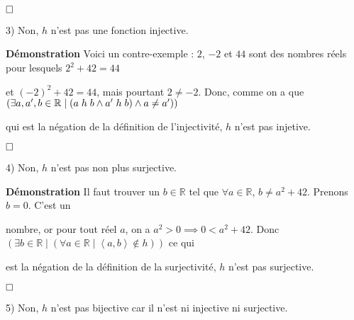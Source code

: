 \documentclass{article}
\newcommand{\tuple}[1]{\ensuremath{\left\langle #1 \right\rangle}}
\begin{document}
$\hfill \square$

3) Non, $h$ n'est pas une fonction injective.

\textbf{Démonstration} Voici un contre-exemple : $2$, $-2$ et $44$ sont des nombres réels pour lesquels $2^2 + 42 = 44$ 

et $(-2)^2 + 42 = 44$, mais pourtant $2 \neq -2$. Donc, comme on a que $ ( \exists a, a^{\prime}, b \in \mathbb{R} \mid ( a \hspace{.1cm} h \hspace{.1cm} b \land a^{\prime} \hspace{.1cm} h \hspace{.1cm} b) \land a \neq a^{\prime} )) $ 

qui est la négation de la définition de l'injectivité, $h$ n'est pas injetive.

$\hfill \square$

4) Non, $h$ n'est pas non plus surjective.

\textbf{Démonstration} Il faut trouver un $b \in \mathbb{R}$ tel que $\forall a \in \mathbb{R}$, $b \neq a^2 + 42$. Prenons $b=0$. C'est un 

nombre, or pour tout réel $a$, on a $a^2 > 0 \implies 0 < a^2 + 42$. Donc $( \exists b \in \mathbb{R} \mid ( \forall a \in \mathbb{R} \mid \tuple{a,b} \notin h ))$ ce qui 

est la négation de la définition de la surjectivité, $h$ n'est pas surjective.

$\hfill \square$

5) Non, $h$ n'est pas bijective car il n'est ni injective ni surjective.

\vspace{0.5cm}
\end{document}
